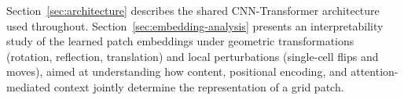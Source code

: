 Section~\ref{sec:architecture} describes the shared CNN-Transformer
architecture used throughout. Section~\ref{sec:embedding-analysis} presents
an interpretability study of the learned patch embeddings under geometric
transformations (rotation, reflection, translation) and local perturbations
(single-cell flips and moves), aimed at understanding how content,
positional encoding, and attention-mediated context jointly determine the
representation of a grid patch.
